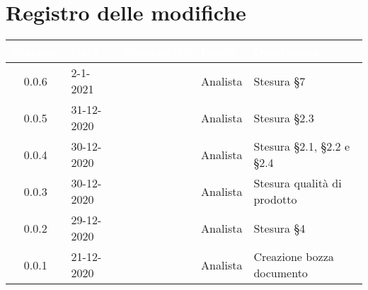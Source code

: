\section*{Registro delle modifiche}
\setcounter{table}{-1}
{
\renewcommand{\arraystretch}{1.5}
\centering
\begin{longtable}{c C{2.6cm} C{3cm} C{2.6cm} C{5cm}}
\textcolor{white}{\textbf{Versione}}&
\textcolor{white}{\textbf{Data}}&
\textcolor{white}{\textbf{Nominativo}}&
\textcolor{white}{\textbf{Ruolo}}&
\textcolor{white}{\textbf{Descrizione}}\\	
\endhead

0.0.6 & 2-1-2021 & \BM{} & Analista & Stesura \S 7 \\
0.0.5 & 31-12-2020 & \BM{} & Analista & Stesura \S 2.3 \\
0.0.4 & 30-12-2020 & \PA{} & Analista & Stesura \S 2.1, \S 2.2 e \S 2.4 \\
0.0.3 & 30-12-2020 & \ZM{} & Analista & Stesura qualità di prodotto\\
0.0.2 & 29-12-2020 & \RA{} & Analista & Stesura \S 4 \\
0.0.1 & 21-12-2020 & \ZM{} & Analista & Creazione bozza documento \\	
\end{longtable}
}
